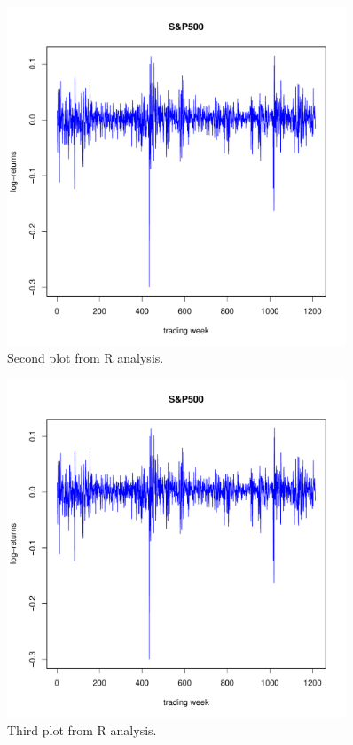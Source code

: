 \documentclass[a4paper,10pt]{article}
\begin{document}
\begin{figure}[h]
    \centering
    \includegraphics[width=0.9\textwidth, page=2]{Rplots.pdf}
    \caption{Second plot from R analysis.}
    \label{fig:rplots2}
\end{figure}

\begin{figure}[h]
    \centering
    \includegraphics[width=0.9\textwidth, page=3]{Rplots.pdf}
    \caption{Third plot from R analysis.}
    \label{fig:rplots3}
\end{figure}
\end{document}
